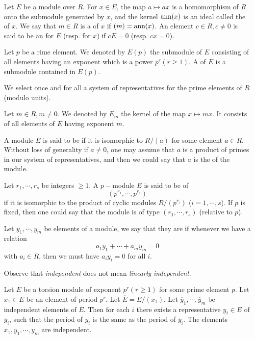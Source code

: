   \begin{defn}
    Let $E$ be a module over $R$. For $x\in E$, the map $a\mapsto ax$ is a homomorphism of $R$ onto the submodule generated by $x$, and the kernel $\operatorname{ann}(x)$ is an ideal called the  of $x$. We say that $m\in R$ is a  of $x$ if $(m)=\operatorname{ann}(x)$. An element $c\in R,c\neq0$ is said to be an  for $E$ (resp. for $x$) if $cE=0$ (resp. $cx=0$).

    Let $p$ be a rime element. We denoted by $E(p)$ the submodule of $E$ consisting of all elements having an exponent which is a power $p^r(r\geqslant1)$. A  of $E$ is a submodule contained in $E(p)$.

    We select once and for all a system of representatives for the prime elements of $R$ (modulo units).

    Let $m\in R,m\neq0$. We denoted by $E_m$ the kernel of the map $x\mapsto mx$. It consists of all elements of $E$ having exponent $m$.

    A module $E$ is said to be  if  it is isomorphic to $R/(a)$ for some element $a\in R$. Without loss of generality if $a\neq0$, one may assume that $a$ is a product of primes in our system of representatives, and then we could say that $a$ is the  of the module.
  \end{defn}
  \begin{defn}
    Let $r_1,\cdots,r_s$ be integers $\geqslant1$. A $p-$module $E$ is said to be of 
    \begin{equation*}
      (p^{r_1},\cdots,p^{r_s})
    \end{equation*}
    if it is isomorphic to the product of cyclic modules $R/(p^{r_i})$ ($i=1,\cdots,s$). If $p$ is fixed, then one could say that the module is of type $(r_1,\cdots,r_s)$ (relative to $p$).
  \end{defn}

  \begin{defn}
    Let $y_1,\cdots,y_m$ be elements of a module, we say that they are  if whenever we have a relation
    \begin{equation*}
      a_1y_1+\cdots+a_my_m=0
    \end{equation*}
    with $a_i\in R$, then we must have $a_iy_i=0$ for all $i$.
  \end{defn}
  \begin{warn}
    Observe that \emph{independent} does not mean \emph{linearly independent}.
  \end{warn}
  \begin{lem}
    Let $E$ be a torsion module of exponent $p^r(r\geqslant1)$ for some prime element $p$. Let $x_1\in E$ be an element of period $p^r$. Let $\overline{E}=E/(x_1)$. Let $\overline{y}_1,\cdots,\overline{y}_m$ be independent elements of $\overline{E}$. Then for each $i$ there exists a representative $y_i\in E$ of $\overline{y}_i$, such that the period of $y_i$ is the same as the period of $\overline{y}_i$. The elements $x_1,y_1,\cdots,y_m$ are independent.
  \end{lem}

